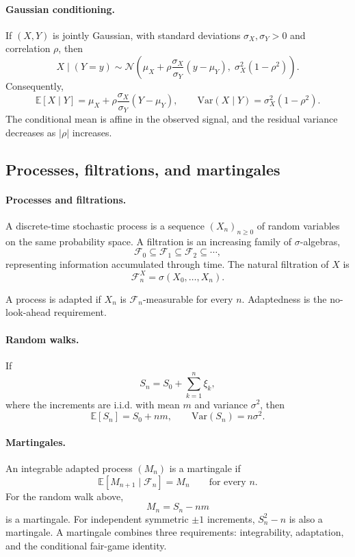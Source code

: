 \documentclass[11pt]{article}
\newcommand{\F}{\mathcal{F}}
\newcommand{\E}{\mathbb{E}}
\newcommand{\Var}{\mathrm{Var}}
\newcommand{\1}{\mathbf{1}}
\theoremstyle{plain}
\theoremstyle{definition}
\theoremstyle{remark}
\begin{document}
\paragraph{Gaussian conditioning.}
If $(X,Y)$ is jointly Gaussian, with standard deviations
$\sigma_X,\sigma_Y>0$ and correlation $\rho$, then
\[
X\mid(Y=y)\sim\mathcal N\!\left(
\mu_X+\rho\frac{\sigma_X}{\sigma_Y}(y-\mu_Y),
\;\sigma_X^2(1-\rho^2)
\right).
\]
Consequently,
\[
\E[X\mid Y]
=\mu_X+\rho\frac{\sigma_X}{\sigma_Y}(Y-\mu_Y),
\qquad
\Var(X\mid Y)=\sigma_X^2(1-\rho^2).
\]
The conditional mean is affine in the observed signal, and the residual
variance decreases as $|\rho|$ increases.

\subsection{Processes, filtrations, and martingales}

\paragraph{Processes and filtrations.}
A discrete-time stochastic process is a sequence $(X_n)_{n\ge0}$ of random
variables on the same probability space. A filtration is an increasing
family of $\sigma$-algebras,
\[
\F_0\subseteq\F_1\subseteq\F_2\subseteq\cdots,
\]
representing information accumulated through time. The natural filtration
of $X$ is
\[
\F_n^X=\sigma(X_0,\ldots,X_n).
\]

A process is adapted if $X_n$ is $\F_n$-measurable for every $n$.
Adaptedness is the no-look-ahead requirement.

\paragraph{Random walks.}
If
\[
S_n=S_0+\sum_{k=1}^n\xi_k,
\]
where the increments are i.i.d. with mean $m$ and variance $\sigma^2$, then
\[
\E[S_n]=S_0+nm,
\qquad
\Var(S_n)=n\sigma^2.
\]

\paragraph{Martingales.}
An integrable adapted process $(M_n)$ is a martingale if
\[
\E[M_{n+1}\mid\F_n]=M_n
\qquad\text{for every }n.
\]
For the random walk above,
\[
M_n=S_n-nm
\]
is a martingale. For independent symmetric $\pm1$ increments,
$S_n^2-n$ is also a martingale. A martingale combines three requirements:
integrability, adaptation, and the conditional fair-game identity.
\end{document}
